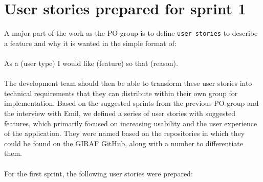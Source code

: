 \section{User stories prepared for sprint 1}\label{pre-sprint-1-user-stories}
A major part of the work as the PO group is to define \texttt{user stories} to describe a feature and why it is wanted in the simple format of:
\\\\
As a (user type) I would like (feature) so that (reason).
\\\\
The development team should then be able to transform these user stories into technical requirements that they can distribute within their own group for implementation.
Based on the suggested sprints from the previous PO group and the interview with Emil, we defined a series of user stories with suggested features, which primarily focused on increasing usability and the user experience of the application.
They were named based on the repositories in which they could be found on the GIRAF GitHub, along with a number to differentiate them.
\\\\
For the first sprint, the following user stories were prepared:

